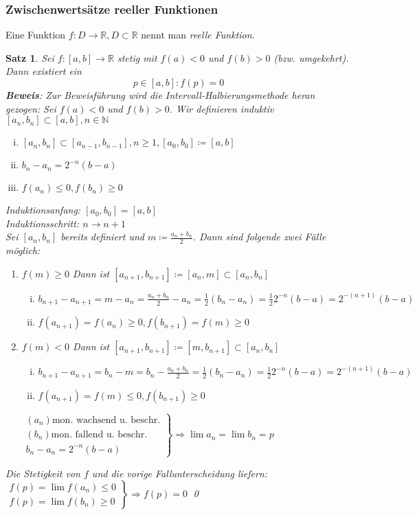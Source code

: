 \documentclass[ngerman,titlepage,twoside, parskip=half*]{scrreprt}
\newcommand*{\N}{\mathbb{N}}
\newcommand*{\R}{\mathbb{R}}
\theoremstyle{plain}
\newtheorem{theorem}{Satz}[section]
\theoremstyle{definition}
\theoremstyle{remark}
\begin{document}
\subsubsection{Zwischenwertsätze reeller Funktionen}
Eine Funktion $f\colon D\rightarrow\R , D\subset \R$ nennt man \emph{reelle Funktion}.
\begin{theorem}
\label{satz:zws}
Sei $f\colon[a,b]\rightarrow \R$ stetig mit $f(a)<0$ und $f(b)>0$ (bzw. umgekehrt). Dann existiert ein
\[p\in[a,b]\colon f(p)=0\]
\textbf{Beweis}: Zur Beweisführung wird die Intervall-Halbierungsmethode heran gezogen:
Sei $f(a)<0$ und $f(b)>0$. Wir definieren induktiv $[a_n,b_n]\subset [a,b], n\in \N$
\begin{enumerate}[(i)]
  \item $[a_n,b_n]\subset [a_{n-1},b_{n-1}], n\geq 1, [a_0,b_0]\coloneqq[a,b]$
  \item $b_n-a_n=2^{-n}(b-a)$
  \item $f(a_n)\leq 0, f(b_n)\geq 0$
\end{enumerate}
Induktionsanfang: $[a_0,b_0]=[a,b]$\\
Induktionsschritt: $n\rightarrow n+1$\\
Sei $[a_n,b_n]$ bereits definiert und $m\coloneqq\frac{a_n+b_n}{2}$. Dann sind folgende zwei Fälle möglich:
\begin{enumerate}[1. F{a}ll]
  \item $f(m)\geq 0$ Dann ist $[a_{n+1},b_{n+1}]\coloneqq[a_n,m]\subset [a_n,b_n]$
    \begin{enumerate}[(i)]
      \item $b_{n+1}-a_{n+1}=m-a_n=\frac{a_n+b_n}{2}-a_n=\frac{1}{2}(b_n-a_n)=\frac{1}{2}2^{-n}(b-a)=2^{-(n+1)}(b-a)$
      \item $f(a_{n+1})=f(a_n)\geq 0, f(b_{n+1})=f(m)\geq 0$
    \end{enumerate}
  \item $f(m)<0$ Dann ist $[a_{n+1},b_{n+1}]\coloneqq[m,b_{n+1}]\subset [a_n,b_n]$
    \begin{enumerate}[(i)]
      \item $b_{n+1}-a_{n+1}=b_n-m=b_n-\frac{a_n+b_n}{2}=\frac{1}{2}(b_n-a_n)=\frac{1}{2}2^{-n}(b-a)=2^{-(n+1)}(b-a)$
      \item $f(a_{n+1})=f(m)\leq 0, f(b_{n+1})\geq 0$
    \end{enumerate}
    $\left.\begin{array}{rcl}
      (a_n) \text{mon. wachsend u. beschr.}\\
      (b_n) \text{mon. fallend u. beschr.}\\
      b_n-a_n=2^{-n}(b-a)
    \end{array}\right\}\Rightarrow \lim a_n=\lim b_n=p$
\end{enumerate}
Die Stetigkeit von $f$ und die vorige Fallunterscheidung liefern:\\
$\left.\begin{array}{rcl}
  f(p)=\lim f(a_n)\leq 0\\
  f(p)=\lim f(b_n)\geq 0
\end{array}\right\}\Rightarrow f(p)=0$
\qed
\end{theorem}
\end{document}
